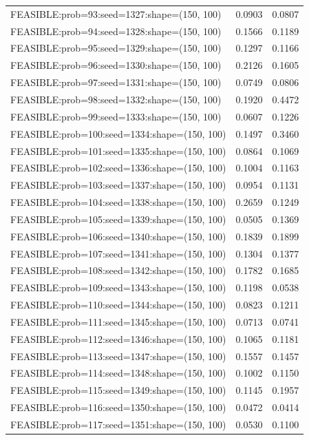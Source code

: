 \begin{longtable}{lcc}
FEASIBLE:prob=93:seed=1327:shape=(150, 100)  &   0.0903 & 0.0807 \\
FEASIBLE:prob=94:seed=1328:shape=(150, 100)  &   0.1566 & 0.1189 \\
FEASIBLE:prob=95:seed=1329:shape=(150, 100)  &   0.1297 & 0.1166 \\
FEASIBLE:prob=96:seed=1330:shape=(150, 100)  &   0.2126 & 0.1605 \\
FEASIBLE:prob=97:seed=1331:shape=(150, 100)  &   0.0749 & 0.0806 \\
FEASIBLE:prob=98:seed=1332:shape=(150, 100)  &   0.1920 & 0.4472 \\
FEASIBLE:prob=99:seed=1333:shape=(150, 100)  &   0.0607 & 0.1226 \\
FEASIBLE:prob=100:seed=1334:shape=(150, 100) &   0.1497 & 0.3460 \\
FEASIBLE:prob=101:seed=1335:shape=(150, 100) &   0.0864 & 0.1069 \\
FEASIBLE:prob=102:seed=1336:shape=(150, 100) &   0.1004 & 0.1163 \\
FEASIBLE:prob=103:seed=1337:shape=(150, 100) &   0.0954 & 0.1131 \\
FEASIBLE:prob=104:seed=1338:shape=(150, 100) &   0.2659 & 0.1249 \\
FEASIBLE:prob=105:seed=1339:shape=(150, 100) &   0.0505 & 0.1369 \\
FEASIBLE:prob=106:seed=1340:shape=(150, 100) &   0.1839 & 0.1899 \\
FEASIBLE:prob=107:seed=1341:shape=(150, 100) &   0.1304 & 0.1377 \\
FEASIBLE:prob=108:seed=1342:shape=(150, 100) &   0.1782 & 0.1685 \\
FEASIBLE:prob=109:seed=1343:shape=(150, 100) &   0.1198 & 0.0538 \\
FEASIBLE:prob=110:seed=1344:shape=(150, 100) &   0.0823 & 0.1211 \\
FEASIBLE:prob=111:seed=1345:shape=(150, 100) &   0.0713 & 0.0741 \\
FEASIBLE:prob=112:seed=1346:shape=(150, 100) &   0.1065 & 0.1181 \\
FEASIBLE:prob=113:seed=1347:shape=(150, 100) &   0.1557 & 0.1457 \\
FEASIBLE:prob=114:seed=1348:shape=(150, 100) &   0.1002 & 0.1150 \\
FEASIBLE:prob=115:seed=1349:shape=(150, 100) &   0.1145 & 0.1957 \\
FEASIBLE:prob=116:seed=1350:shape=(150, 100) &   0.0472 & 0.0414 \\
FEASIBLE:prob=117:seed=1351:shape=(150, 100) &   0.0530 & 0.1100 \\

\end{longtable}
